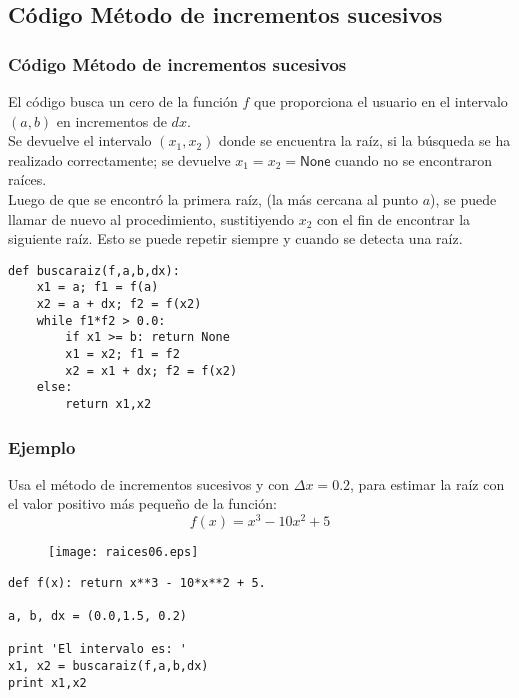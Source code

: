 \subsection{Código Método de incrementos sucesivos}
\begin{frame}
\frametitle{Código Método de incrementos sucesivos}
El código busca un cero de la función $f$ que proporciona el usuario en el intervalo
$(a,b)$ en incrementos de $dx$.
\\
\bigskip
Se devuelve el intervalo $(x_{1}, x_{2})$ donde se encuentra la raíz, si la búsqueda
se ha realizado correctamente; se devuelve $x_{1} = x_{2} = \mathsf{None}$ cuando no se encontraron raíces.
\\
\bigskip
Luego de que se encontró la primera raíz, (la más cercana al punto $a$), se puede llamar de nuevo al procedimiento, sustitiyendo $x_{2}$ con el fin de encontrar la siguiente raíz. Esto se puede repetir siempre y cuando se detecta una raíz.
\end{frame}
\begin{frame}[fragile]
\begin{lstlisting}
def buscaraiz(f,a,b,dx):
    x1 = a; f1 = f(a)
    x2 = a + dx; f2 = f(x2)
    while f1*f2 > 0.0:
        if x1 >= b: return None
        x1 = x2; f1 = f2
        x2 = x1 + dx; f2 = f(x2)
    else:
        return x1,x2
\end{lstlisting}
\end{frame}
\begin{frame}
\frametitle{Ejemplo}
Usa el método de incrementos sucesivos y con $\Delta x= 0.2$, para estimar la raíz con el valor positivo más pequeño de la función:
\[ f(x) = x^{3} - 10 x^{2} + 5\]
\end{frame}
\begin{frame}
\begin{figure}
	\centering
	\texttt{[image: raices06.eps]} 
\end{figure}
\end{frame}
\begin{frame}[fragile]
\begin{lstlisting}
def f(x): return x**3 - 10*x**2 + 5.

a, b, dx = (0.0,1.5, 0.2)

print 'El intervalo es: '
x1, x2 = buscaraiz(f,a,b,dx)
print x1,x2
\end{lstlisting}
\end{frame}
